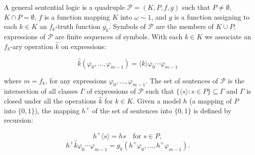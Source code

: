 A general sentential logic is a quadruple $\mathcal{P} = (K, P, f, g)$ such that $P \neq \emptyset$, $K \cap P = \emptyset$, $f$ is a function mapping $K$ into $\omega \sim 1$, and $g$ is a function assigning to each $k \in K$ an $f_k$-truth function $g_k$. Symbols of $\mathcal{P}$ are the members of $K \cup P$; expressions of $\mathcal{P}$ are finite sequences of symbols. With each $k \in K$ we associate an $f_k$-ary operation $\hat{k}$ on expressions:

$$\hat{k}(\varphi_0, \ldots, \varphi_{m-1}) = \langle k \rangle \varphi_0 \cdots \varphi_{m-1}$$

where $m = f_k$, for any expressions $\varphi_0, \ldots, \varphi_{m-1}$. The set of sentences of $\mathcal{P}$ is the intersection of all classes $\Gamma$ of expressions of $\mathcal{P}$ such that $\{\langle s \rangle : s \in P\} \subseteq \Gamma$ and $\Gamma$ is closed under all the operations $\hat{k}$ for $k \in K$. Given a model $h$ (a mapping of $P$ into $\{0,1\}$), the mapping $h^+$ of the set of sentences into $\{0,1\}$ is defined by recursion:

$$h^+ \langle s \rangle = hs \quad \text{for } s \in P,$$
$$h^+ \hat{k} \varphi_0 \cdots \varphi_{m-1} = g_k(h^+ \varphi_0, \ldots, h^+ \varphi_{m-1}).$$
